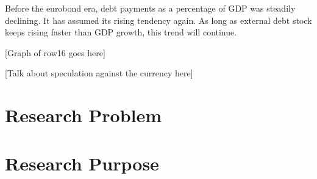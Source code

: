 \documentclass[a4paper, 12pt]{article}
\begin{document}
	Before the eurobond era, debt payments as a percentage of GDP
	was steadily declining. It has assumed its rising tendency again. As
	long as external debt stock keeps rising faster than GDP growth,
	this trend will continue.
	
	[Graph of row16 goes here] 
	
	[Talk about speculation against the currency here]
	\section{Research Problem}
	\section{Research Purpose}
	\newpage
	\singlespacing
		
	
\end{document}
